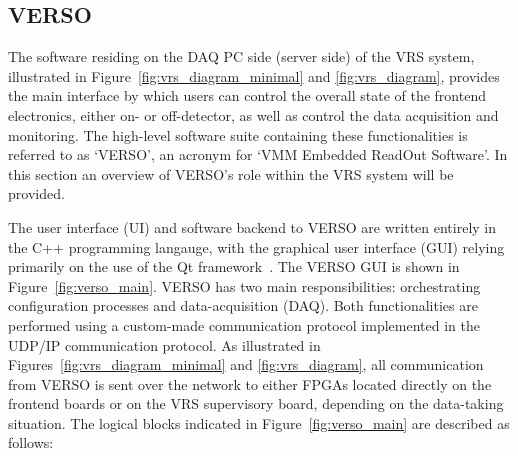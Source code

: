 \subsection{VERSO}
\label{sec:verso}

The software residing on the DAQ PC side (server side) of the VRS system,
illustrated in Figure~\ref{fig:vrs_diagram_minimal} and \ref{fig:vrs_diagram},
provides the main interface by which users can control the overall
state of the frontend electronics, either on- or off-detector,
as well as control the data acquisition and monitoring.
The high-level software suite containing these functionalities is referred
to as `VERSO', an acronym for `VMM Embedded ReadOut Software'.
In this section an overview of VERSO's role within the VRS system will be provided.

The user interface (UI) and software backend to VERSO are written entirely in the C++ programming langauge,
with the graphical user interface (GUI) relying primarily on the use of the Qt framework~\cite{QtCompany}.
The VERSO GUI is shown in Figure~\ref{fig:verso_main}.
VERSO has two main responsibilities: orchestrating configuration processes and
data-acquisition (DAQ).
Both functionalities are performed using a custom-made communication protocol
implemented in the UDP/IP communication protocol.
As illustrated in Figures~\ref{fig:vrs_diagram_minimal} and \ref{fig:vrs_diagram},
all communication from VERSO is sent over the network to either FPGAs located directly
on the frontend boards or on the VRS supervisory board, depending on the
data-taking situation.
The logical blocks indicated in Figure~\ref{fig:verso_main} are described as follows:

